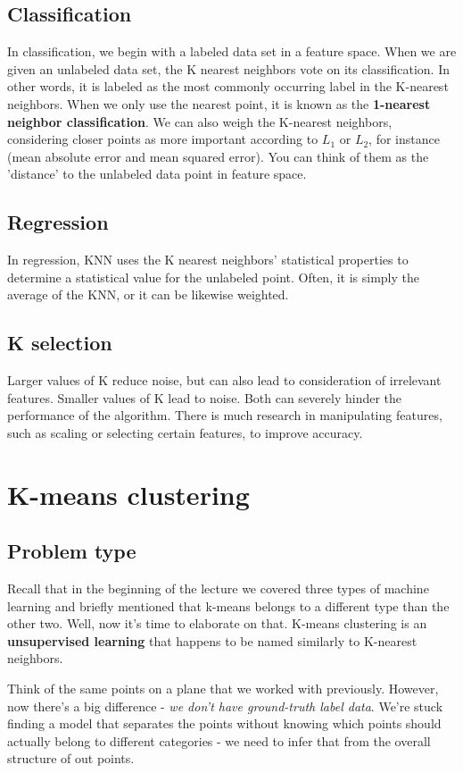 \documentclass{article}
\begin{document}
\subsection{Classification}
In classification, we begin with a labeled data set in a feature space. When we are given an unlabeled data set, the K nearest neighbors vote on its classification. In other words, it is labeled as the most commonly occurring label in the K-nearest neighbors. When we only use the nearest point, it is known as the \textbf{1-nearest neighbor classification}. We can also weigh the K-nearest neighbors, considering closer points as more important according to $L_1$ or $L_2$, for instance (mean absolute error and mean squared error). You can think of them as the 'distance' to the unlabeled data point in feature space.

\subsection{Regression}
In regression, KNN uses the K nearest neighbors' statistical properties to determine a statistical value for the unlabeled point. Often, it is simply the average of the KNN, or it can be likewise weighted.

\subsection{K selection}
Larger values of K reduce noise, but can also lead to consideration of irrelevant features. Smaller values of K lead to noise. Both can severely hinder the performance of the algorithm. There is much research in manipulating features, such as scaling or selecting certain features, to improve accuracy.

\section{K-means clustering}

\subsection{Problem type}
Recall that in the beginning of the lecture we covered three types of machine learning and briefly mentioned that k-means belongs to a different type than the other two. Well, now it's time to elaborate on that. K-means clustering is an \textbf{unsupervised learning} that happens to be named similarly to K-nearest neighbors.

Think of the same points on a plane that we worked with previously. However, now there's a big difference - \textit{we don't have ground-truth label data}. We're stuck finding a model that separates the points without knowing which points should actually belong to different categories - we need to infer that from the overall structure of out points.
\end{document}
